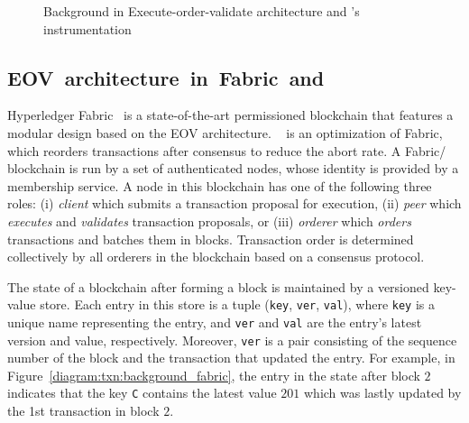 \begin{figure}[h!]
\begin{subfigure}{0.28\textwidth}
      \caption{}
      \label{diagram:txn:background_orderer}
    \end{subfigure}
    \caption{Background in Execute-order-validate architecture and {\fabricPlusplus}'s instrumentation}
    \label{diagram:txn:background}
\end{figure}

\subsection{EOV~architecture~in~Fabric~and~{\fabricPlusplus}}
\label{ch:txn:background_fabric}

Hyperledger Fabric~\cite{androulaki2018hyperledger} is a state-of-the-art
permissioned blockchain that features a modular design based on the EOV architecture.
%
{\fabricPlusplus}~\cite{sharma2019blurring} is an optimization of Fabric, which reorders transactions after consensus to reduce the abort rate.
%
A Fabric/{\fabricPlusplus} blockchain is run by a set of authenticated nodes, whose identity is
provided by a membership service.
%
A node in this blockchain has one of the following three roles:
%
(i) \textit{client} which submits a transaction proposal for execution,
%
(ii) \textit{peer} which \textit{executes} and \textit{validates}
transaction proposals,
%
or (iii) \textit{orderer} which \textit{orders} transactions and batches
them in blocks.
%
Transaction order is determined collectively by all orderers in
the blockchain based on a consensus protocol.
%

The state of a blockchain after forming a block is maintained by a
versioned key-value store.
% 
Each entry in this store is a tuple (\texttt{key}, \texttt{ver},
\texttt{val}), where \texttt{key} is a unique name representing the entry, and
\texttt{ver} and \texttt{val} are the entry's latest version and value, respectively.
% 
Moreover, \texttt{ver} is a pair consisting of the sequence number of the block
and the transaction that updated the entry.
%
For example, in Figure~\ref{diagram:txn:background_fabric}, the entry  in
the state after block $2$ indicates that the key \texttt{C} contains the latest
value $201$ which was lastly updated by the 1st transaction in block $2$.


